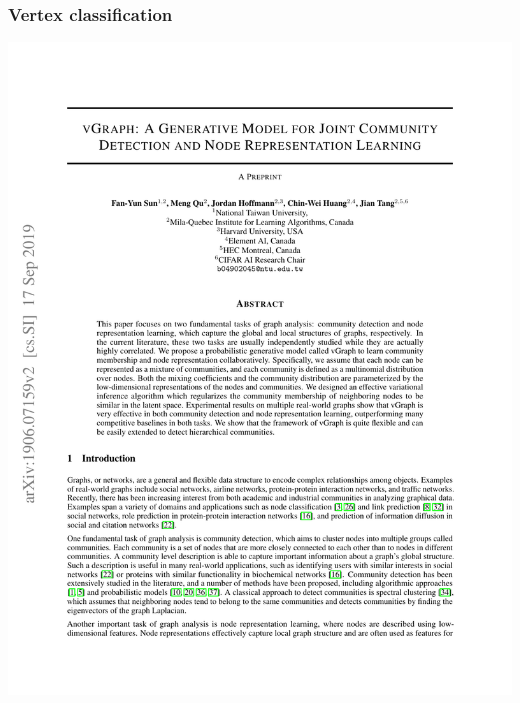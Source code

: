 \documentclass[12pt,aspectratio=169]{beamer}
\begin{document}
    \begin{frame}
        \frametitle{Vertex classification}

        \centering
        \includegraphics[page=7,trim=2.5cm 19cm 2.5cm 6cm,clip,scale=.8]{vGraph.pdf}
    \end{frame}
\end{document}
